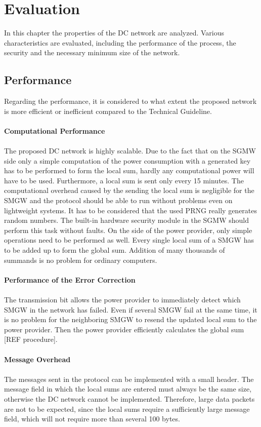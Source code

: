 \chapter{Evaluation}
\label{Evaluation}
In this chapter the properties of the DC network are analyzed. Various characteristics are evaluated, including the performance of the process, the security and the necessary minimum size of the network.
\section{Performance}
Regarding the performance, it is considered to what extent the proposed network is more efficient or inefficient compared to the Technical Guideline.\\
\\
\textbf{Computational Performance}
\\
\\
The proposed DC network is highly scalable. Due to the fact that on the SGMW side only a simple computation of the power consumption with a generated key has to be performed to form the local sum, hardly any computational power will have to be used. Furthermore, a local sum is sent only every 15 minutes. The computational overhead caused by the sending the local sum is negligible for the SMGW and the protocol should be able to run without problems even on lightweight systems. It has to be considered that the used PRNG really generates random numbers. The built-in hardware security module in the SGMW should perform this task without faults. On the side of the power provider, only simple operations need to be performed as well. Every single local sum of a SMGW has to be added up to form the global sum. Addition of many thousands of summands is no problem for ordinary computers.  \\
\\
\textbf{Performance of the Error Correction}
\\
\\
The transmission bit allows the power provider to immediately detect which SMGW in the network has failed. Even if several SMGW fail at the same time, it is no problem for the neighboring SMGW to resend the updated local sum to the power provider. Then the power provider efficiently calculates the global sum [REF procedure]. \\
\\
\textbf{Message Overhead}
\\
\\
The messages sent in the protocol can be implemented with a small header. The message field in which the local sums are entered must always be the same size, otherwise the DC network cannot be implemented. Therefore, large data packets are not to be expected, since the local sums require a sufficiently large message field, which will not require more than several 100 bytes. \\
